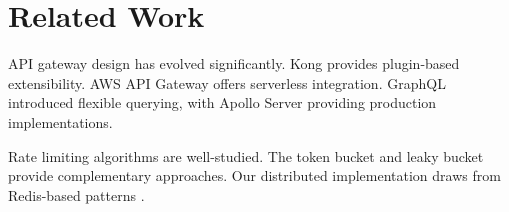 \section{Related Work}


API gateway design has evolved significantly. Kong \cite{kong2019} provides plugin-based extensibility. AWS API Gateway \cite{aws2019} offers serverless integration. GraphQL \cite{graphql2015} introduced flexible querying, with Apollo Server \cite{apollo2019} providing production implementations.

Rate limiting algorithms are well-studied. The token bucket \cite{turner1986} and leaky bucket \cite{bellovin1999} provide complementary approaches. Our distributed implementation draws from Redis-based patterns \cite{redis2019}.

